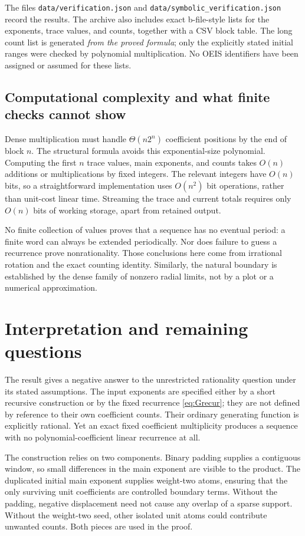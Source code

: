 \documentclass[11pt]{article}
\theoremstyle{definition}\newtheorem{definition}[theorem]{Definition}
\theoremstyle{remark}\newtheorem{remark}[theorem]{Remark}
\begin{document}
The files \texttt{data/verification.json} and \texttt{data/symbolic\_verification.json} record the results. The archive also includes exact b-file-style lists for the exponents, trace values, and counts, together with a CSV block table. The long count list is generated \emph{from the proved formula}; only the explicitly stated initial ranges were checked by polynomial multiplication. No OEIS identifiers have been assigned or assumed for these lists.

\subsection{Computational complexity and what finite checks cannot show}

Dense multiplication must handle $\Theta(n2^n)$ coefficient positions by the end of block $n$. The structural formula avoids this exponential-size polynomial. Computing the first $n$ trace values, main exponents, and counts takes $O(n)$ additions or multiplications by fixed integers. The relevant integers have $O(n)$ bits, so a straightforward implementation uses $O(n^2)$ bit operations, rather than unit-cost linear time. Streaming the trace and current totals requires only $O(n)$ bits of working storage, apart from retained output.

No finite collection of values proves that a sequence has no eventual period: a finite word can always be extended periodically. Nor does failure to guess a recurrence prove nonrationality. Those conclusions here come from irrational rotation and the exact counting identity. Similarly, the natural boundary is established by the dense family of nonzero radial limits, not by a plot or a numerical approximation.

\section{Interpretation and remaining questions}

The result gives a negative answer to the unrestricted rationality question under its stated assumptions. The input exponents are specified either by a short recursive construction or by the fixed recurrence \eqref{eq:Grecur}; they are not defined by reference to their own coefficient counts. Their ordinary generating function is explicitly rational. Yet an exact fixed coefficient multiplicity produces a sequence with no polynomial-coefficient linear recurrence at all.

The construction relies on two components. Binary padding supplies a contiguous window, so small differences in the main exponent are visible to the product. The duplicated initial main exponent supplies weight-two atoms, ensuring that the only surviving unit coefficients are controlled boundary terms. Without the padding, negative displacement need not cause any overlap of a sparse support. Without the weight-two seed, other isolated unit atoms could contribute unwanted counts. Both pieces are used in the proof.
\end{document}
